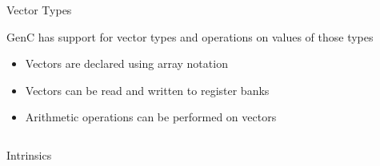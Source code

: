 \begin{frame}[fragile]{Vector Types}

GenC has support for vector types and operations on values of those types
\begin{itemize}
\item \alert<2>{Vectors are declared using array notation}
\item \alert<3>{Vectors can be read and written to register banks}
\item \alert<4>{Arithmetic operations can be performed on vectors}
\end{itemize}

\begin{columns}
\begin{column}{0.99\textwidth}
\centering
{}
\end{column}
\begin{column}{0.01\textwidth}
\vspace{0.3\textheight}
\end{column}
\end{columns}

\end{frame}

\begin{frame}{Intrinsics}

\end{frame}

